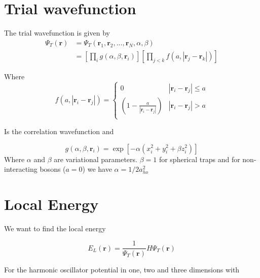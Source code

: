 \documentclass[
    a4paper, aps, twocolumn, floatfix, superscriptaddress,
    nofootinbib]{revtex4-1}
\begin{document}
\printbibliography

\begin{appendices}

\section{Trial wavefunction}
The trial wavefunction is given by
\begin{align}
    \Psi_T(\boldsymbol{r}) &= \Psi_T(\boldsymbol{r}_1,\boldsymbol{r}_2,...,\boldsymbol{r}_N,\alpha,\beta) \\
    &= \left[\prod_i g(\alpha,\beta,\boldsymbol{r}_i)\right] \left[\prod_{j<k} f(a,|\boldsymbol{r}_j - \boldsymbol{r}_k|)\right]
\end{align}

Where
\begin{equation}\label{eq:2}
    f(a,|\boldsymbol{r}_i - \boldsymbol{r}_j|) =
    \begin{cases}
      0 & |\boldsymbol{r}_i - \boldsymbol{r}_j|\leq a \\
     \left(1-\frac{a}{|\boldsymbol{r}_i - \boldsymbol{r}_j|}\right) & |\boldsymbol{r}_i - \boldsymbol{r}_j| > a\\
    \end{cases} 
\end{equation}

Is the correlation wavefunction and 

\begin{equation}
    g(\alpha, \beta, \boldsymbol{r}_i) =  \exp[-\alpha(x_i^2 + y_i^2 + \beta z_i^2)]
\end{equation}
Where $\alpha$ and $\beta$ are variational parameters. $\beta = 1$ for spherical traps  and for non-interacting bosons ($a=0$) we have $\alpha = 1/2a_{ho}^2$ 
\newline

\section{Local Energy}\label{appendix:local_energy}
We want to find the local energy  

\begin{equation}
   E_L(\boldsymbol{r}) =  \frac{1}{\Psi_T(\boldsymbol{r})} H \Psi_T(\boldsymbol{r})
\end{equation}

For the harmonic oscillator potential in one, two and three dimensions with


\end{appendices}
\end{document}
